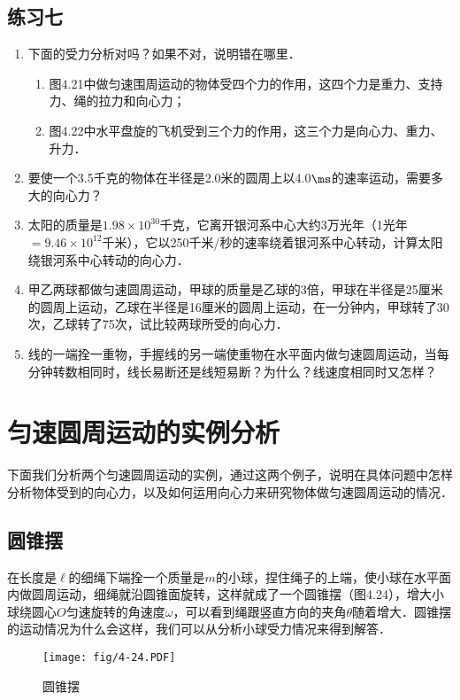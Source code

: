 \subsection*{练习七}
\begin{enumerate}
	\item 下面的受力分析对吗？如果不对，说明错在哪里．
	\begin{enumerate}
		\item 图4.21中做匀速围周运动的物体受四个力的作用，这四个力是重力、支持力、绳的拉力和向心力；
		\item 图4.22中水平盘旋的飞机受到三个力的作用，这三个力是向心力、重力、升力．
	\end{enumerate}
\item 要使一个3.5千克的物体在半径是2.0米的圆周上以4.0$\ms$的速率运动，需要多大的向心力？
\item 太阳的质量是$1.98\times 10^{30}$千克，它离开银河系中心大约3万光年（1光年$=9.46\times 10^{12}$千米），它以250千米/秒的速率绕着银河系中心转动，计算太阳绕银河系中心转动的向心力．
\item 甲乙两球都做匀速圆周运动，甲球的质量是乙球的3倍，甲球在半径是25厘米的圆周上运动，乙球在半径是16厘米的圆周上运动，在一分钟内，甲球转了30次，乙球转了75次，试比较两球所受的向心力．
\item 线的一端拴一重物，手握线的另一端使重物在水平面内做匀速圆周运动，当每分钟转数相同时，线长易断还是线短易断？为什么？线速度相同时又怎样？
\end{enumerate}


\section{匀速圆周运动的实例分析}
下面我们分析两个匀速圆周运动的实例，通过这两个例子，说明在具体问题中怎样分析物体受到的向心力，以及如何运用向心力来研究物体做匀速圆周运动的情况．

\subsection{圆锥摆}

在长度是$\ell$的细绳下端拴一个质量是$m$的小球，捏住绳子的上端，使小球在水平面内做圆周运动，细绳就沿圆锥面旋转，这样就成了一个圆锥摆（图4.24），增大小球绕圆心$O$匀速旋转的角速度$\omega$，可以看到绳跟竖直方向的夹角$\theta$随着增大．圆锥摆的运动情况为什么会这样，我们可以从分析小球受力情况来得到解答．

\begin{figure}[htp]
\centering\texttt{[image: fig/4-24.PDF]}
\caption{圆锥摆}
\end{figure}

